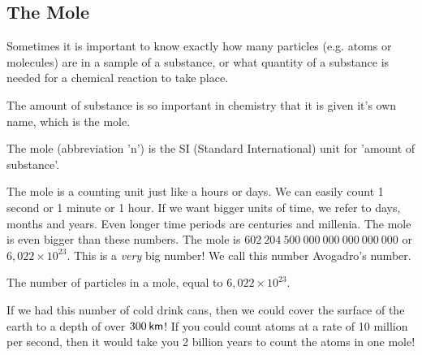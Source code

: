             \subsection*{The Mole}
            \nopagebreak
      \label{m38717*id275573}Sometimes it is important to know exactly how many particles (e.g. atoms or molecules) are in a sample of a substance, or what quantity of a substance is needed for a chemical reaction to take place.\par 
\label{m38717*eip-872}The amount of substance is so important in chemistry that it is given it's own name, which is the mole.  \par \label{m38717*fhsst!!!underscore!!!id119}\pagebreak
{} { \label{m38717*meaningfhsst!!!underscore!!!id119}
      \label{m38717*id275969}The mole (abbreviation 'n') is the SI (Standard International) unit for 'amount of substance'. \par 
       } 
The mole is a counting unit just like a hours or days. We can easily count 1 second or 1 minute or 1 hour. If we want bigger units of time, we refer to days, months and years. Even longer time periods are centuries and millenia. The mole is even bigger than these numbers. The mole is $602 ~204 ~500 ~000 ~000 ~000 ~000 ~000$ or $6,022 \times 10^{23}$. This is a \textsl{very} big number! We call this number Avogadro's number. \label{m38717*fhsst!!!underscore!!!id123}
 { \label{m38717*meaningfhsst!!!underscore!!!id123}
      \label{m38717*id276010}The number of particles in a mole, equal to $6,022\ensuremath{\times}{10}^{23}$. \par 
       } 
\label{m38717*eip-446}If we had this number of cold drink cans, then we could cover the surface of the earth to a depth of over $300\phantom{\rule{2pt}{0ex}}\mathsf{km}$! If you could count atoms at a rate of 10 million per second, then it would take you 2 billion years to count the atoms in one mole!\par \label{m38717*notfhsst!!!underscore!!!id126}
